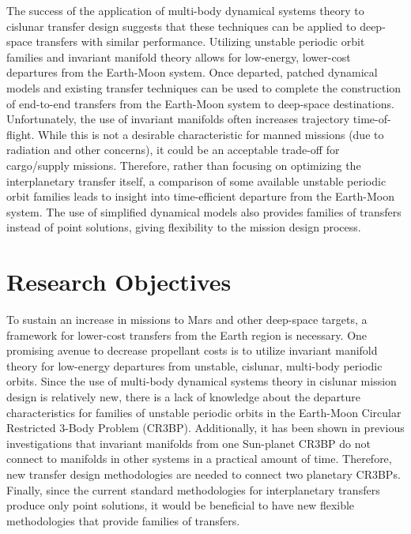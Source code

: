 The success of the application of multi-body dynamical systems theory to cislunar transfer design
suggests that these techniques can be applied to deep-space transfers with similar performance.
Utilizing unstable periodic orbit families and invariant manifold theory allows for low-energy,
lower-cost departures from the Earth-Moon system. Once departed, patched dynamical models and
existing transfer techniques can be used to complete the construction of end-to-end transfers from
the Earth-Moon system to deep-space destinations. Unfortunately, the use of invariant manifolds
often increases trajectory time-of-flight. While this is not a desirable characteristic for manned
missions (due to radiation and other concerns), it could be an acceptable trade-off for
cargo/supply missions. Therefore, rather than focusing on optimizing the interplanetary transfer
itself, a comparison of some available unstable periodic orbit families leads to insight into
time-efficient departure from the Earth-Moon system. The use of simplified dynamical models also
provides families of transfers instead of point solutions, giving flexibility to the mission design
process. 

\section{Research Objectives}
To sustain an increase in missions to Mars and other deep-space targets, a framework for lower-cost
transfers from the Earth region is necessary. One promising avenue to decrease propellant costs is
to utilize invariant manifold theory for low-energy departures from unstable, cislunar, multi-body
periodic orbits. Since the use of multi-body dynamical systems theory in cislunar mission design is
relatively new, there is a lack of knowledge about the departure characteristics for families of
unstable periodic orbits in the Earth-Moon Circular Restricted 3-Body Problem (CR3BP). Additionally,
it has been shown in previous investigations that invariant manifolds from one Sun-planet CR3BP
do not connect to manifolds in other systems in a practical amount of time\cite{Koon:2000}.
Therefore, new transfer design methodologies are needed to connect two planetary CR3BPs. Finally,
since the current standard methodologies for interplanetary transfers produce only point solutions,
it would be beneficial to have new flexible methodologies that provide families of transfers.

